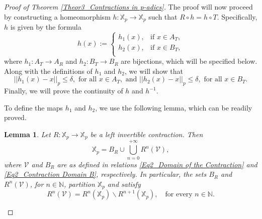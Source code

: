 \documentclass[a4paper, 12pt]{article}
\newtheorem{lemma}[theorem]{Lemma}
\theoremstyle{definition}
\begin{document}
\begin{proof}[Proof of Theorem \ref{Theor3_Contractions in p-adics}]
		The proof will now proceed by constructing a homeomorphism $h: \mathbb{X}_{p} \to \mathbb{X}_{p}$ such that $R \circ h = h \circ T$.  Specifically, $h$ is given by the formula 
		\begin{equation}\label{Eq3_Conjugation Fundamental Domains A and B}
			h \left(  x  \right)  :=   \begin{cases}
				h_{1} \left(  x  \right) ,  & \text{if } x \in A_{T},  \\ 
				h_{2} \left(  x  \right) ,   & \text{if } x \in B_{T},  \\  
			\end{cases}
		\end{equation}
		where $h_{1}: A_{T} \to A_{R}$ and $h_{2}: B_{T} \to B_{R}$ are bijections, which will be specified below. Along with the definitions of $h_{1}$ and $h_{2}$, we will show that 
		\begin{equation}\label{Eq3_Conjugation h delta close to Identity}
			\left| \left|  h_{1}(x) - x  \right|  \right|_{p}   \le   \delta,   \text{ for all } x \in A_{T}, \text{ and }    \left| \left|  h_{2}(x) - x  \right|  \right|_{p}   \le   \delta,   \text{ for all } x \in B_{T}. 
		\end{equation}
		Finally, we will prove the continuity of $h$ and $h^{-1}$. 
		
		
		To define the maps $h_{1}$ and $h_{2}$, we use the following lemma, which can be readily proved.   
		
		\begin{lemma}\label{Lem2_Domain of the Contraction}
			Let $R: \mathbb{X}_{p} \to \mathbb{X}_{p}$ be a left invertible contraction. Then 
			\begin{equation}\label{Eq2_Partition Domain}
				\mathbb{X}_{p}   =   B_{R} \cup \bigcup_{n=0}^{+ \infty } R^{n} \left(  \mathcal{V}  \right)  , 
			\end{equation}
			where $ \mathcal{V} $ and $B_{R}$ are as defined in relations \eqref{Eq2_Domain of the Contraction} and \eqref{Eq2_Contraction Domain B}, respectively.
			In particular, the sets $B_{R}$ and $R^{n} \left(  \mathcal{V}  \right) $, for $n \in \mathbb{N} $,  partition $\mathbb{X}_{p}$ and satisfy 
			\begin{equation}\label{Eq2_Partition Domain Explicit}
				R^{n} \left(  \mathcal{V}  \right)    =   R^{n} \left(  \mathbb{X}_{p}  \right)  \backslash R^{n+1} \left(  \mathbb{X}_{p}  \right) , \quad \text{for every }  n \in  \mathbb{N} .  
			\end{equation}
			

\end{lemma}
\end{proof}
\end{document}
